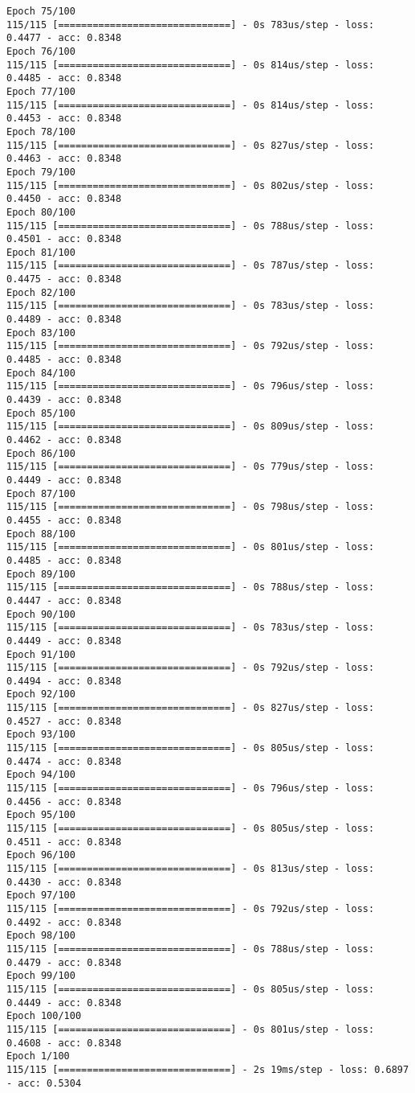 \documentclass[11pt]{article}
\begin{document}
\begin{Verbatim}[commandchars=\\\{\}]
Epoch 75/100
115/115 [==============================] - 0s 783us/step - loss: 0.4477 - acc: 0.8348
Epoch 76/100
115/115 [==============================] - 0s 814us/step - loss: 0.4485 - acc: 0.8348
Epoch 77/100
115/115 [==============================] - 0s 814us/step - loss: 0.4453 - acc: 0.8348
Epoch 78/100
115/115 [==============================] - 0s 827us/step - loss: 0.4463 - acc: 0.8348
Epoch 79/100
115/115 [==============================] - 0s 802us/step - loss: 0.4450 - acc: 0.8348
Epoch 80/100
115/115 [==============================] - 0s 788us/step - loss: 0.4501 - acc: 0.8348
Epoch 81/100
115/115 [==============================] - 0s 787us/step - loss: 0.4475 - acc: 0.8348
Epoch 82/100
115/115 [==============================] - 0s 783us/step - loss: 0.4489 - acc: 0.8348
Epoch 83/100
115/115 [==============================] - 0s 792us/step - loss: 0.4485 - acc: 0.8348
Epoch 84/100
115/115 [==============================] - 0s 796us/step - loss: 0.4439 - acc: 0.8348
Epoch 85/100
115/115 [==============================] - 0s 809us/step - loss: 0.4462 - acc: 0.8348
Epoch 86/100
115/115 [==============================] - 0s 779us/step - loss: 0.4449 - acc: 0.8348
Epoch 87/100
115/115 [==============================] - 0s 798us/step - loss: 0.4455 - acc: 0.8348
Epoch 88/100
115/115 [==============================] - 0s 801us/step - loss: 0.4485 - acc: 0.8348
Epoch 89/100
115/115 [==============================] - 0s 788us/step - loss: 0.4447 - acc: 0.8348
Epoch 90/100
115/115 [==============================] - 0s 783us/step - loss: 0.4449 - acc: 0.8348
Epoch 91/100
115/115 [==============================] - 0s 792us/step - loss: 0.4494 - acc: 0.8348
Epoch 92/100
115/115 [==============================] - 0s 827us/step - loss: 0.4527 - acc: 0.8348
Epoch 93/100
115/115 [==============================] - 0s 805us/step - loss: 0.4474 - acc: 0.8348
Epoch 94/100
115/115 [==============================] - 0s 796us/step - loss: 0.4456 - acc: 0.8348
Epoch 95/100
115/115 [==============================] - 0s 805us/step - loss: 0.4511 - acc: 0.8348
Epoch 96/100
115/115 [==============================] - 0s 813us/step - loss: 0.4430 - acc: 0.8348
Epoch 97/100
115/115 [==============================] - 0s 792us/step - loss: 0.4492 - acc: 0.8348
Epoch 98/100
115/115 [==============================] - 0s 788us/step - loss: 0.4479 - acc: 0.8348
Epoch 99/100
115/115 [==============================] - 0s 805us/step - loss: 0.4449 - acc: 0.8348
Epoch 100/100
115/115 [==============================] - 0s 801us/step - loss: 0.4608 - acc: 0.8348
Epoch 1/100
115/115 [==============================] - 2s 19ms/step - loss: 0.6897 - acc: 0.5304

\end{Verbatim}
\end{document}
